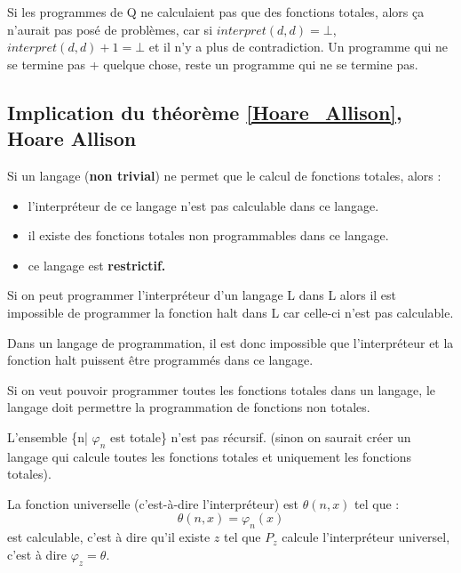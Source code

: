 \begin{myrem}
	Si les programmes de Q ne calculaient pas que des fonctions totales, alors ça n'aurait pas posé de problèmes, car si $interpret(d,d)=\bot$, $interpret(d,d)+1=\bot$ et il n'y a plus de contradiction.  Un programme qui ne se termine pas + quelque chose, reste un programme qui ne se termine pas.
\end{myrem}

\subsection[Implication du théorème de Hoare Allison]{Implication du théorème \ref{Hoare_Allison}, Hoare Allison}
\begin{myprop}
	Si un langage (\textbf{non trivial}) ne permet que le calcul de fonctions totales, alors :
	\begin{itemize}
		\item l'interpréteur de ce langage n'est pas calculable dans ce langage.
		\item il existe des fonctions totales non programmables dans ce langage.
		\item ce langage est \bf{restrictif}.
	\end{itemize}
\end{myprop}

\begin{myprop}
	Si on peut programmer l'interpréteur d'un langage L dans L alors il est
	impossible de programmer la fonction halt dans L car celle-ci n'est pas calculable.
\end{myprop}

\begin{myprop}
	Dans un langage de programmation, il est donc impossible que
	l'interpréteur et la fonction halt puissent être programmés dans ce langage.
\end{myprop}

\begin{myprop}
	Si on veut pouvoir programmer toutes les fonctions totales dans un langage, le langage doit permettre la programmation de fonctions non totales.
\end{myprop}

\begin{myprop}
	L'ensemble \{n| $\varphi_n$ est totale\} n'est pas récursif.
    (sinon on saurait créer un langage qui calcule toutes les fonctions totales et uniquement les fonctions totales).
\end{myprop}

\begin{mytheo}
  \label{theo:fununiv}
	La fonction universelle (c'est-à-dire l'interpréteur) est $\theta(n,x)$ tel que :
	\[ \theta(n,x) = \varphi_n(x) \]
    est calculable, c'est à dire qu'il existe $z$ tel que $P_z$ calcule l'interpréteur universel,
    c'est à dire $\varphi_z = \theta$.
\end{mytheo}

